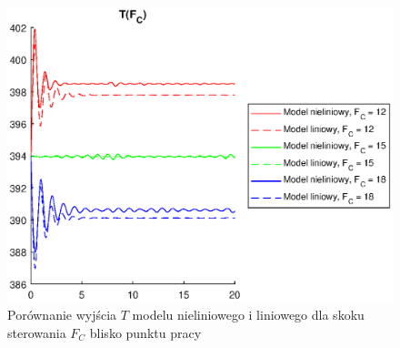 \begin{figure}
\centering
\includegraphics[width=.8\linewidth]{plot/lin_tfc_0.eps}
\caption{Porównanie wyjścia $T$ modelu nieliniowego i liniowego dla skoku sterowania $F_C$ blisko punktu pracy}
\label{fig:lintfc0}
\end{figure}

